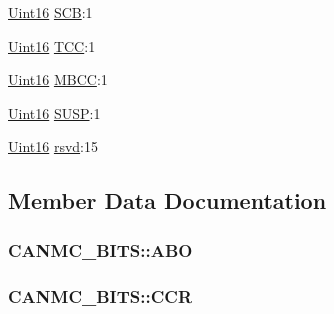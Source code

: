 \begin{DoxyCompactItemize}
\item 
\hyperlink{_d_s_p2833x___device_8h_a59a9f6be4562c327cbfb4f7e8e18f08b}{Uint16} \hyperlink{struct_c_a_n_m_c___b_i_t_s_a6400c713c75ccdc1fbd8f85ac29a2c30}{S\+C\+B}\+:1
\item 
\hyperlink{_d_s_p2833x___device_8h_a59a9f6be4562c327cbfb4f7e8e18f08b}{Uint16} \hyperlink{struct_c_a_n_m_c___b_i_t_s_a975a19b7f19a593ac6c15fc53a9646e4}{T\+C\+C}\+:1
\item 
\hyperlink{_d_s_p2833x___device_8h_a59a9f6be4562c327cbfb4f7e8e18f08b}{Uint16} \hyperlink{struct_c_a_n_m_c___b_i_t_s_a384e1004cf4fdeeabecccb5d64cf3243}{M\+B\+C\+C}\+:1
\item 
\hyperlink{_d_s_p2833x___device_8h_a59a9f6be4562c327cbfb4f7e8e18f08b}{Uint16} \hyperlink{struct_c_a_n_m_c___b_i_t_s_a03ec63131fbda5678cb68ae55fd94fbe}{S\+U\+S\+P}\+:1
\item 
\hyperlink{_d_s_p2833x___device_8h_a59a9f6be4562c327cbfb4f7e8e18f08b}{Uint16} \hyperlink{struct_c_a_n_m_c___b_i_t_s_a027ab7c7dafeb9d1a95aafceaf02f481}{rsvd}\+:15
\end{DoxyCompactItemize}


\subsection{Member Data Documentation}
\hypertarget{struct_c_a_n_m_c___b_i_t_s_a34144b286395f016718ded2f57ddd60d}{}
\subsubsection[{A\+B\+O}]{ C\+A\+N\+M\+C\+\_\+\+B\+I\+T\+S\+::\+A\+B\+O}\label{struct_c_a_n_m_c___b_i_t_s_a34144b286395f016718ded2f57ddd60d}
\hypertarget{struct_c_a_n_m_c___b_i_t_s_a1faef147297bb079b702b94fecfda0e9}{}
\subsubsection[{C\+C\+R}]{ C\+A\+N\+M\+C\+\_\+\+B\+I\+T\+S\+::\+C\+C\+R}\label{struct_c_a_n_m_c___b_i_t_s_a1faef147297bb079b702b94fecfda0e9}
\hypertarget{struct_c_a_n_m_c___b_i_t_s_a7e14ab8d2e468e8521006a215c453bd6}{}

